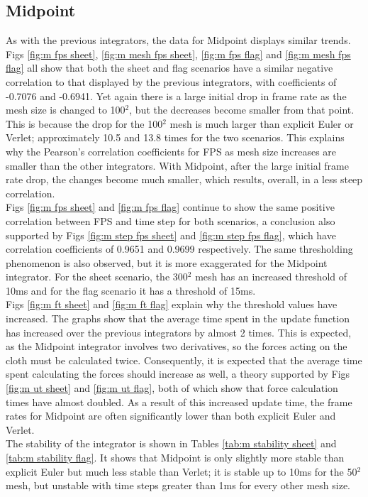 \subsection{Midpoint}
As with the previous integrators, the data for Midpoint displays similar trends.
\\Figs \ref{fig:m fps sheet}, \ref{fig:m mesh fps sheet}, \ref{fig:m fps flag} and \ref{fig:m mesh fps flag} all show that both the sheet and flag scenarios have a similar negative correlation to that displayed by the previous integrators, with coefficients of -0.7076 and -0.6941. Yet again there is a large initial drop in frame rate as the mesh size is changed to 100$^{2}$, but the decreases become smaller from that point. This is because the drop for the 100$^{2}$ mesh is much larger than explicit Euler or Verlet; approximately 10.5 and 13.8 times for the two scenarios. This explains why the Pearson's correlation coefficients for FPS as mesh size increases are smaller than the other integrators. With Midpoint, after the large initial frame rate drop, the changes become much smaller, which results, overall, in a less steep correlation.
\\Figs \ref{fig:m fps sheet} and \ref{fig:m fps flag} continue to show the same positive correlation between FPS and time step for both scenarios, a conclusion also supported by Figs \ref{fig:m step fps sheet} and \ref{fig:m step fps flag}, which have correlation coefficients of 0.9651 and 0.9699 respectively. The same thresholding phenomenon is also observed, but it is more exaggerated for the Midpoint integrator. For the sheet scenario, the 300$^{2}$ mesh has an increased threshold of 10ms and for the flag scenario it has a threshold of 15ms.
\\Figs \ref{fig:m ft sheet} and \ref{fig:m ft flag} explain why the threshold values have increased. The graphs show that the average time spent in the update function has increased over the previous integrators by almost 2 times. This is expected, as the Midpoint integrator involves two derivatives, so the forces acting on the cloth must be calculated twice. Consequently, it is expected that the average time spent calculating the forces should increase as well, a theory supported by Figs \ref{fig:m ut sheet} and \ref{fig:m ut flag}, both of which show that force calculation times have almost doubled. As a result of this increased update time, the frame rates for Midpoint are often significantly lower than both explicit Euler and Verlet.
\\The stability of the integrator is shown in Tables \ref{tab:m stability sheet} and \ref{tab:m stability flag}. It shows that Midpoint is only slightly more stable than explicit Euler but much less stable than Verlet; it is stable up to 10ms for the 50$^{2}$ mesh, but unstable with time steps greater than 1ms for every other mesh size.
